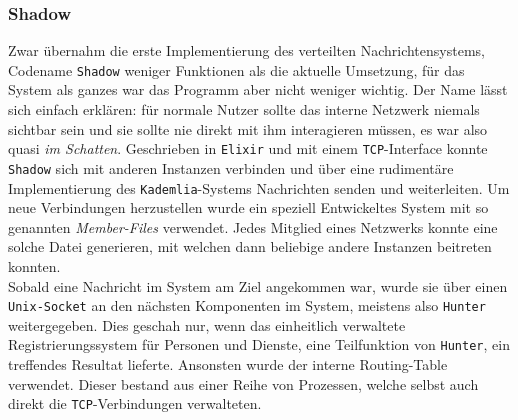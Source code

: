 \documentclass[11pt]{article}
\begin{document}
\subsubsection{Shadow}
\label{sec:org3f76794}
Zwar übernahm die erste Implementierung des verteilten
Nachrichtensystems, Codename \texttt{Shadow} weniger Funktionen als die
aktuelle Umsetzung, für das System als ganzes war das Programm aber
nicht weniger wichtig. Der Name lässt sich einfach erklären: für
normale Nutzer sollte das interne Netzwerk niemals sichtbar sein und
sie sollte nie direkt mit ihm interagieren müssen, es war also quasi
\emph{im Schatten}. Geschrieben in \texttt{Elixir} und mit einem \texttt{TCP}-Interface konnte
\texttt{Shadow} sich mit anderen Instanzen verbinden und über eine rudimentäre
Implementierung des \texttt{Kademlia}-Systems Nachrichten senden und
weiterleiten. Um neue Verbindungen herzustellen wurde ein speziell
Entwickeltes System mit so genannten \emph{Member-Files} verwendet. Jedes
Mitglied eines Netzwerks konnte eine solche Datei generieren, mit
welchen dann beliebige andere Instanzen beitreten konnten.\\

\noindent Sobald eine Nachricht im System am Ziel angekommen war,
wurde sie über einen \texttt{Unix-Socket} an den nächsten Komponenten im
System, meistens also \texttt{Hunter} weitergegeben. Dies geschah nur, wenn das
einheitlich verwaltete Registrierungssystem für Personen und Dienste,
eine Teilfunktion von \texttt{Hunter}, ein treffendes Resultat lieferte.
Ansonsten wurde der interne Routing-Table verwendet. Dieser bestand
aus einer Reihe von Prozessen, welche selbst auch direkt die
\texttt{TCP}-Verbindungen verwalteten. 
\end{document}
